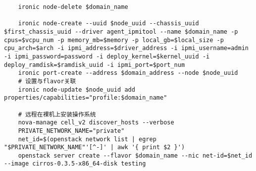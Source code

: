 \documentclass[a4paper,left=2.5cm,right=2.5cm,11pt]{article}
\begin{document}
\begin{lstlisting}
	ironic node-delete $domain_name

	ironic node-create --uuid $node_uuid --chassis_uuid $first_chassis_uuid --driver agent_ipmitool --name $domain_name -p cpus=$vcpu_num -p memory_mb=$memory -p local_gb=$local_size -p cpu_arch=$arch -i ipmi_address=$driver_address -i ipmi_username=admin -i ipmi_password=password -i deploy_kernel=$kernel_uuid -i deploy_ramdisk=$ramdisk_uuid -i ipmi_port=$port_num
	ironic port-create --address $domain_address --node $node_uuid
	# 设置与flavor关联
	ironic node-update $node_uuid add properties/capabilities="profile:$domain_name"

	# 远程在裸机上安装操作系统
	nova-manage cell_v2 discover_hosts --verbose
	PRIVATE_NETWORK_NAME="private"
	net_id=$(openstack network list | egrep "$PRIVATE_NETWORK_NAME"'[^-]' | awk '{ print $2 }')
	openstack server create --flavor $domain_name --nic net-id=$net_id --image cirros-0.3.5-x86_64-disk testing
	\end{lstlisting}
\end{document}
